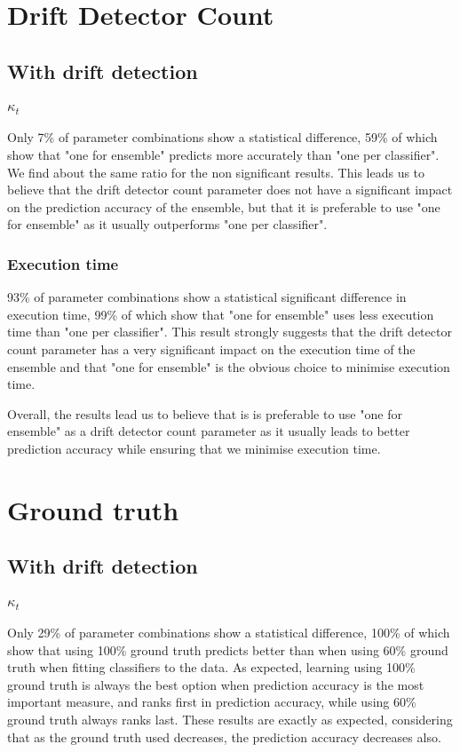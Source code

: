 \section{Drift Detector Count}
\subsection{With drift detection}
\subsubsection{$\kappa_t$}
Only 7\% of parameter combinations show a statistical difference, 59\% of which show that "one for ensemble" predicts more accurately than "one per classifier". We find about the same ratio for the non significant results. This leads us to believe that the drift detector count parameter does not have a significant impact on the prediction accuracy of the ensemble, but that it is preferable to use "one for ensemble" as it usually outperforms "one per classifier".

\subsubsection{Execution time}
93\% of parameter combinations show a statistical significant difference in execution time, 99\% of which show that "one for ensemble" uses less execution time than "one per classifier". This result strongly suggests that the drift detector count parameter has a very significant impact on the execution time of the ensemble and that "one for ensemble" is the obvious choice to minimise execution time.

Overall, the results lead us to believe that is is preferable to use "one for ensemble" as a drift detector count parameter as it usually leads to better prediction accuracy while ensuring that we minimise execution time.

\section{Ground truth}
\subsection{With drift detection}
\subsubsection{$\kappa_t$}
Only 29\% of parameter combinations show a statistical difference, 100\% of which show that using 100\% ground truth predicts better than when using 60\% ground truth when fitting classifiers to the data. As expected, learning using 100\% ground truth is always the best option when prediction accuracy is the most important measure, and ranks first in prediction accuracy, while using 60\% ground truth always ranks last.
These results are exactly as expected, considering that as the ground truth used decreases, the prediction accuracy decreases also.

